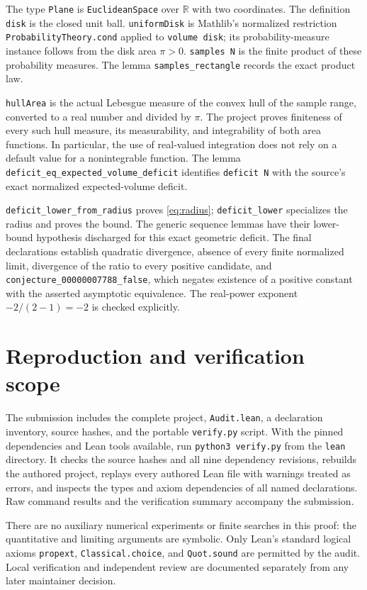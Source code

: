 \documentclass[11pt]{article}
\newcommand{\R}{\mathbb R}
\begin{document}
The type \nolinkurl{Plane} is \nolinkurl{EuclideanSpace} over $\R$ with two
coordinates. The definition \nolinkurl{disk} is the closed unit ball.
\nolinkurl{uniformDisk} is Mathlib's normalized restriction
\nolinkurl{ProbabilityTheory.cond} applied to \texttt{volume disk}; its probability-measure
instance follows from the disk area $\pi>0$.
\texttt{samples N} is the finite product of these probability measures.
The lemma \nolinkurl{samples_rectangle} records the exact product law.

\nolinkurl{hullArea} is the actual Lebesgue measure of the convex hull of
the sample range, converted to a real number and divided by $\pi$.
The project proves finiteness of every such hull measure, its
measurability, and integrability of both area functions. In particular,
the use of real-valued integration does not rely on a default value
for a nonintegrable function. The lemma
\nolinkurl{deficit_eq_expected_volume_deficit} identifies
\texttt{deficit N} with the source's exact normalized expected-volume
deficit.

\nolinkurl{deficit_lower_from_radius} proves \eqref{eq:radius};
\nolinkurl{deficit_lower} specializes the radius and proves the bound.
The generic sequence lemmas have their lower-bound hypothesis
discharged for this exact geometric deficit. The final declarations
establish quadratic divergence, absence of every finite normalized
limit, divergence of the ratio to every positive candidate, and
\nolinkurl{conjecture_00000007788_false}, which negates existence of a
positive constant with the asserted asymptotic equivalence. The
real-power exponent $-2/(2-1)=-2$ is checked explicitly.

\section{Reproduction and verification scope}
The submission includes the complete project, \nolinkurl{Audit.lean}, a
declaration inventory, source hashes, and the portable
\nolinkurl{verify.py} script. With the pinned dependencies and Lean tools
available, run \texttt{python3 verify.py} from the \nolinkurl{lean}
directory. It checks the source hashes and all nine dependency
revisions, rebuilds the authored project, replays every authored Lean
file with warnings treated as errors, and inspects the types and axiom
dependencies of all named declarations. Raw command results and the
verification summary accompany the submission.

There are no auxiliary numerical experiments or finite searches in
this proof: the quantitative and limiting arguments are symbolic.
Only Lean's standard logical axioms
\nolinkurl{propext}, \nolinkurl{Classical.choice}, and \nolinkurl{Quot.sound}
are permitted by the audit. Local verification and independent review
are documented separately from any later maintainer decision.
\end{document}
